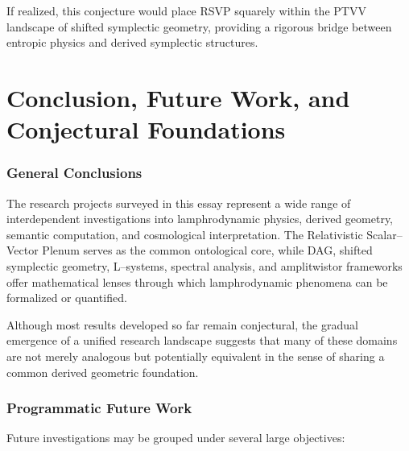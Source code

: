 \documentclass[12pt]{article}
\theoremstyle{plain}
\theoremstyle{definition}
\theoremstyle{remark}
\begin{document}
If realized, this conjecture would place RSVP squarely within the PTVV
landscape of shifted symplectic geometry, providing a rigorous bridge between
entropic physics and derived symplectic structures.

\newpage



\part{Conclusion, Future Work, and Conjectural Foundations}


\section{General Conclusions}

The research projects surveyed in this essay represent a wide range of
interdependent investigations into lamphrodynamic physics, derived geometry,
semantic computation, and cosmological interpretation. The Relativistic
Scalar--Vector Plenum serves as the common ontological core, while DAG, 
shifted symplectic geometry, L--systems, spectral analysis, and 
amplitwistor frameworks offer mathematical lenses through which lamphrodynamic
phenomena can be formalized or quantified.

Although most results developed so far remain conjectural, the gradual
emergence of a unified research landscape suggests that many of these domains
are not merely analogous but potentially equivalent in the sense of sharing
a common derived geometric foundation.


\section{Programmatic Future Work}

Future investigations may be grouped under several large objectives:
\end{document}
